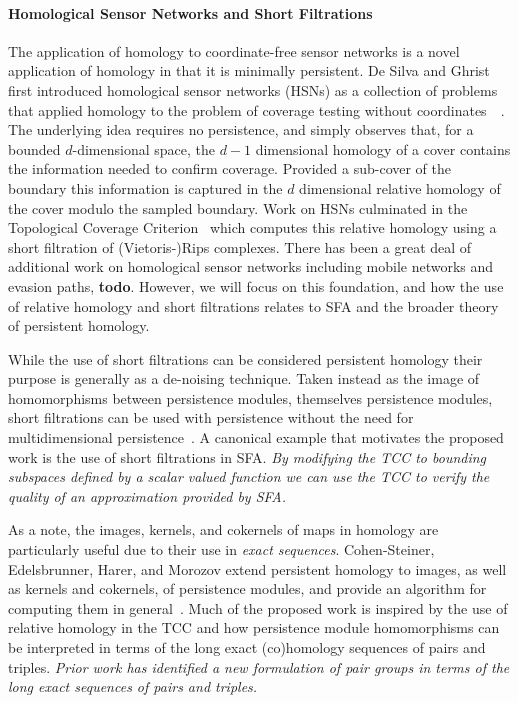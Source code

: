 
\paragraph{Homological Sensor Networks and Short Filtrations}

The application of homology to coordinate-free sensor networks is a novel application of homology in that it is minimally persistent.
De Silva and Ghrist first introduced homological sensor networks (HSNs) as a collection of problems that applied homology to the problem of coverage testing without coordinates~~\cite{desilva06coordinate,desilva07homological}.
The underlying idea requires no persistence, and simply observes that, for a bounded $d$-dimensional space, the $d-1$ dimensional homology of a cover contains the information needed to confirm coverage.
Provided a sub-cover of the boundary this information is captured in the $d$ dimensional relative homology of the cover modulo the sampled boundary.
Work on HSNs culminated in the Topological Coverage Criterion~\cite{desilva07coverage} which computes this relative homology using a short filtration of (Vietoris-)Rips complexes.
There has been a great deal of additional work on homological sensor networks including mobile networks and evasion paths, \textbf{todo}.
However, we will focus on this foundation, and how the use of relative homology and short filtrations relates to SFA and the broader theory of persistent homology.

While the use of short filtrations can be considered persistent homology their purpose is generally as a de-noising technique.
Taken instead as the image of homomorphisms between persistence modules, themselves persistence modules, short filtrations can be used with persistence without the need for multidimensional persistence~\cite{todo}.
A canonical example that motivates the proposed work is the use of short filtrations in SFA.
\emph{By modifying the TCC to bounding subspaces defined by a scalar valued function we can use the TCC to verify the quality of an approximation provided by SFA.}

As a note, the images, kernels, and cokernels of maps in homology are particularly useful due to their use in \emph{exact sequences}.
Cohen-Steiner, Edelsbrunner, Harer, and Morozov extend persistent homology to images, as well as kernels and cokernels, of persistence modules, and provide an algorithm for computing them in general~\cite{cohen09persistent}.
Much of the proposed work is inspired by the use of relative homology in the TCC and how persistence module homomorphisms can be interpreted in terms of the long exact (co)homology sequences of pairs and triples.
\emph{Prior work has identified a new formulation of pair groups in terms of the long exact sequences of pairs and triples.}

